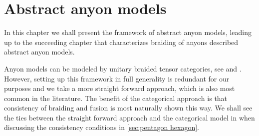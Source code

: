 \documentclass[a4paper,10pt,oneside]{book}
\theoremstyle{plain}
\theoremstyle{definition}
\theoremstyle{remark}
\begin{document}









































\chapter{Abstract anyon models}\label{anyon models}

In this chapter we shall present the framework of abstract anyon models, leading up to the succeeding chapter that characterizes braiding of anyons described abstract anyon models.

Anyon models can be modeled by unitary braided tensor categories, see \cite[appendix E]{kitaev} and \cite{naaijkens,prakash,tensor categories,tuba}. However, setting up this framework in full generality is redundant for our purposes and we take a more straight forward approach, which is also most common in the literature. The benefit of the categorical approach is that consistency of braiding and fusion is most naturally shown this way. We shall see the ties between the straight forward approach and the categorical model in when discussing the consistency conditions in \cref{sec:pentagon hexagon}.
\end{document}
